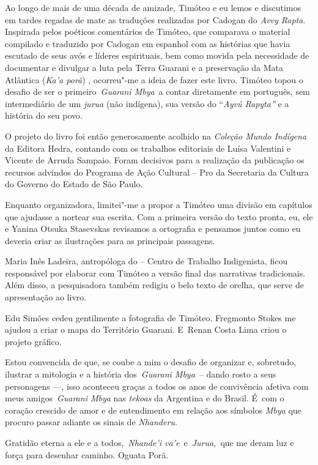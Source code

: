 Ao longo de mais de uma década de amizade, Timóteo e eu lemos e
discutimos em tardes regadas de mate as traduções realizadas por Cadogan
do \emph{Avvy Rapta}. Inspirada pelos poéticos comentários de Timóteo,
que comparava o material compilado e traduzido por Cadogan em espanhol
com as histórias que havia escutado de seus avós e líderes espirituais,
bem como movida pela necessidade de documentar e divulgar a luta pela
Terra Guarani e a preservação da Mata Atlântica (\emph{Ka'a porã}) ,
ocorreu"-me a ideia de fazer este livro. Timóteo topou o desafio de ser o
primeiro~\emph{Guarani Mbya}~a contar diretamente em português, sem
intermediário de um \emph{jurua} (não indígena), sua versão do
``\emph{Ayvú Rapyta''} e a história do seu povo.

O projeto do livro foi então generosamente acolhido na \emph{Coleção
Mundo Indígena} da Editora Hedra, contando com os trabalhos editoriais
de Luísa Valentini e Vicente de Arruda Sampaio. Foram decisivos para a
realização da publicação os recursos advindos do Programa de Ação
Cultural -- Pro da Secretaria da Cultura do Governo do Estado de São
Paulo.

Enquanto organizadora, limitei"-me a propor a Timóteo uma divisão em
capítulos que ajudasse a nortear sua escrita. Com a primeira versão do
texto pronta, eu, ele e Yanina Otsuka Stasevskas revisamos a ortografia
e pensamos juntos como eu deveria criar as ilustrações para as
principais passagens.

Maria Inês Ladeira, antropóloga do  -- Centro de Trabalho
Indigenista, ficou responsável por elaborar com Timóteo a versão final
das narrativas tradicionais. Além disso, a pesquisadora também redigiu o
belo texto de orelha, que serve de apresentação ao livro.

Edu Simões cedeu gentilmente a fotografia de Timóteo. Fregmonto Stokes
me ajudou a criar o mapa do Território Guarani. E~Renan Costa Lima criou
o projeto gráfico.

Estou convencida de que, se coube a mim o desafio de organizar e,
sobretudo, ilustrar a mitologia e a história dos~\emph{Guarani Mbya}~--
dando rosto a seus personagens \mbox{---,} isso aconteceu graças a todos os anos
de convivência afetiva com meus amigos~\emph{Guarani Mbya} nas
\emph{tekoas} da Argentina e do Brasil. É~com o coração crescido de amor
e de entendimento em relação aos símbolos \emph{Mbya} que procuro passar
adiante os sinais de \emph{Nhanderu}.

Gratidão eterna a ele e a todos,~\emph{Nhande'i
va'e}~e~\emph{Jurua,}~que me deram luz e força para desenhar caminho.
Oguata Porã.

